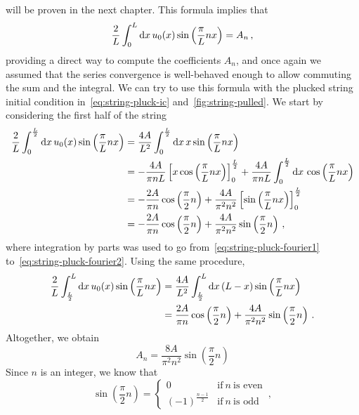 will be proven in the next chapter. This formula implies that
\begin{equation}
	\label{eq:u0-coef}
	\frac{2}{L}\int_{0}^{L}\mathrm{d} x\, u_0(x)\sin\left(\frac{\pi}{L}nx\right)=A_n\,,
\end{equation}
providing a direct way to compute the coefficients $A_n$, and once again we assumed that
the series convergence is well-behaved enough to allow commuting the sum and the integral.
We can try to use this formula with the plucked string initial condition
in~\cref{eq:string-pluck-ic} and~\cref{fig:string-pulled}. We start by considering the
first half of the string
\begin{align}
	\frac{2}{L}\int_{0}^{\frac{L}{2}}\mathrm{d} x\, u_0(x)\sin\left(\frac{\pi}{L}nx\right)
	 & =\frac{4A}{L^2}\int_{0}^{\frac{L}{2}}\mathrm{d} x\, x\sin\left(\frac{\pi}{L}nx\right)   \\
	\label{eq:string-pluck-fourier1}
	 & =-\frac{4A}{\pi n L}\left[x\cos\left(\frac{\pi}{L}nx\right)\right]_0^{\frac{L}{2}}
	+\frac{4A}{\pi n L}\int_{0}^{\frac{L}{2}}\mathrm{d} x\,\cos\left(\frac{\pi}{L}nx\right)    \\
	\label{eq:string-pluck-fourier2}
	 & =-\frac{2A}{\pi n}\cos\left(\frac{\pi}{2}n\right)+\frac{4A}{\pi^2 n^2}
	\left[\sin\left(\frac{\pi}{L}nx\right)\right]_0^{\frac{L}{2}}                         \\
	 & =-\frac{2A}{\pi n}\cos\left(\frac{\pi}{2}n\right)+\frac{4A}{\pi^2 n^2}
	\sin\left(\frac{\pi}{2}n\right)\,,
\end{align}
where integration by parts was used to go from~\cref{eq:string-pluck-fourier1}
to~\cref{eq:string-pluck-fourier2}. Using the same procedure,
\begin{align}
	\frac{2}{L}\int_{\frac{L}{2}}^{L}\mathrm{d} x\, u_0(x)\sin\left(\frac{\pi}{L}nx\right)
	 & =\frac{4A}{L^2}\int_{\frac{L}{2}}^{L}\mathrm{d} x\, (L-x)\sin\left(\frac{\pi}{L}nx\right) \\
	 & =\frac{2A}{\pi n}\cos\left(\frac{\pi}{2}n\right)+\frac{4A}{\pi^2 n^2}
	\sin\left(\frac{\pi}{2}n\right)\,.
\end{align}
Altogether, we obtain
\begin{equation}
	A_n=\frac{8A}{\pi^2 n^2}\sin\left(\frac{\pi}{2}n\right)
\end{equation}
Since $n$ is an integer, we know that
\begin{equation}
	\sin\left(\frac{\pi}{2}n\right)=
	\begin{cases}
		0                    & \text{if}~n~\text{is even} \\
		(-1)^{\frac{n-1}{2}} & \text{if}~n~\text{is odd}
	\end{cases}\,,\label{eq:sinpn2}
\end{equation}
